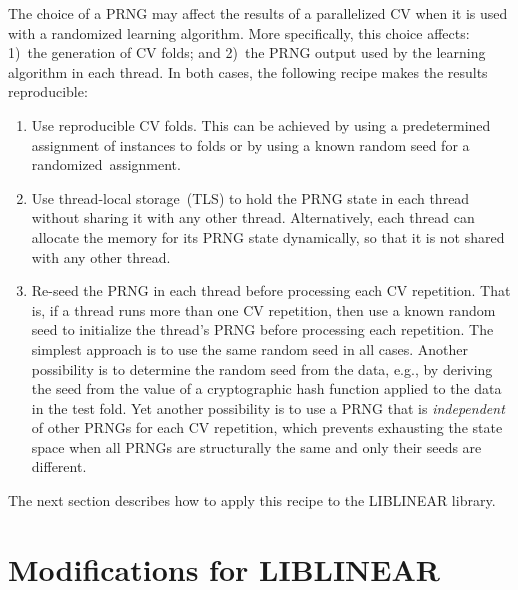 The choice of a PRNG may affect the results of a parallelized CV when it is used
with a randomized learning algorithm. More specifically, this choice affects:
1)~the generation of CV folds; and 2)~the PRNG output used by the learning
algorithm in each thread. In both cases, the following recipe makes the results
reproducible:
\begin{enumerate}
\item Use reproducible CV folds. This can be achieved by using a predetermined
  assignment of instances to folds or by using a known random seed for
  a randomized~assignment.
\item Use thread-local storage~(TLS) to hold the PRNG state in each thread
  without sharing it with any other thread. Alternatively, each thread can
  allocate the memory for its PRNG state dynamically, so that it is not shared
  with any other thread.
\item Re-seed the PRNG in each thread before processing each CV repetition. That
  is, if a thread runs more than one CV repetition, then use a known
  random seed to initialize the thread's PRNG before processing each repetition.
  The simplest approach is to use the same random seed in all cases.
%
  Another possibility is to determine the random seed from the data, e.g., by
  deriving the seed from the value of a cryptographic hash function applied to
  the data in the test fold.
  Yet another possibility is to use a PRNG that is
  \emph{independent} of other PRNGs for each CV
  repetition\supercite{matsumoto1998dynamic}, which prevents exhausting the state
  space when all PRNGs are structurally the same and only their seeds are different.
\end{enumerate}
The next section describes how to apply this recipe to the LIBLINEAR library.


\clearpage
\section{Modifications for LIBLINEAR}
\label{sec:LL-mods}

